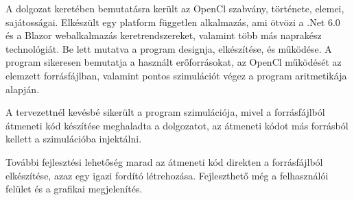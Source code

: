 
A dolgozat keretében bemutatásra került az OpenCl szabvány, története, elemei, sajátosságai.
Elkészült egy platform független alkalmazás, ami ötvözi a .Net 6.0 és a Blazor webalkalmazás keretrendszereket, valamint több más naprakész technológiát. Be lett mutatva a program designja, elkészítése, és működése. A program sikeresen bemutatja a használt erőforrásokat, az OpenCl működését az elemzett forrásfájlban, valamint pontos szimulációt végez a program aritmetikája alapján.

A tervezettnél kevésbé sikerült a program szimulációja, mivel a forrásfájlból átmeneti kód készítése meghaladta a dolgozatot, az átmeneti kódot más forrásból kellett a szimulációba injektálni.

További fejlesztési lehetőség  marad az átmeneti kód direkten a forrásfájlból elkészítése, azaz egy igazi fordító létrehozása. Fejleszthető még a felhasználói felület és a grafikai megjelenítés.

